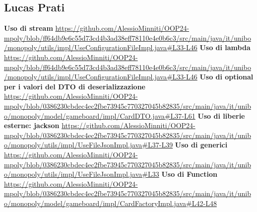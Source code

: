 \subsection{Lucas Prati}
\textbf{Uso di stream}\newline
\url{https://github.com/AlessioMinniti/OOP24-mpoly/blob/ff64db9e6c55d73cd4b3ad38eff78110e4e0b6c3/src/main/java/it/unibo/monopoly/utils/impl/UseConfigurationFileImpl.java#L33-L46}\newline
\textbf{Uso di lambda}\newline
\url{https://github.com/AlessioMinniti/OOP24-mpoly/blob/ff64db9e6c55d73cd4b3ad38eff78110e4e0b6c3/src/main/java/it/unibo/monopoly/utils/impl/UseConfigurationFileImpl.java#L33-L46}\newline
\textbf{Uso di optional per i valori del DTO di deserializzazione}\newline
\url{https://github.com/AlessioMinniti/OOP24-mpoly/blob/0386230cbdec4ec2fbe73945c770327045b82835/src/main/java/it/unibo/monopoly/model/gameboard/impl/CardDTO.java#L37-L61}\newline
\textbf{Uso di liberie esterne: jackson}\newline
\url{https://github.com/AlessioMinniti/OOP24-mpoly/blob/0386230cbdec4ec2fbe73945c770327045b82835/src/main/java/it/unibo/monopoly/utils/impl/UseFileJsonImpl.java#L37-L39}\newline
\textbf{Uso di generici}\newline
\url{https://github.com/AlessioMinniti/OOP24-mpoly/blob/0386230cbdec4ec2fbe73945c770327045b82835/src/main/java/it/unibo/monopoly/utils/impl/UseFileJsonImpl.java#L33}\newline
\textbf{Uso di Function}\newline
\url{https://github.com/AlessioMinniti/OOP24-mpoly/blob/0386230cbdec4ec2fbe73945c770327045b82835/src/main/java/it/unibo/monopoly/model/gameboard/impl/CardFactoryImpl.java#L42-L48}\newline